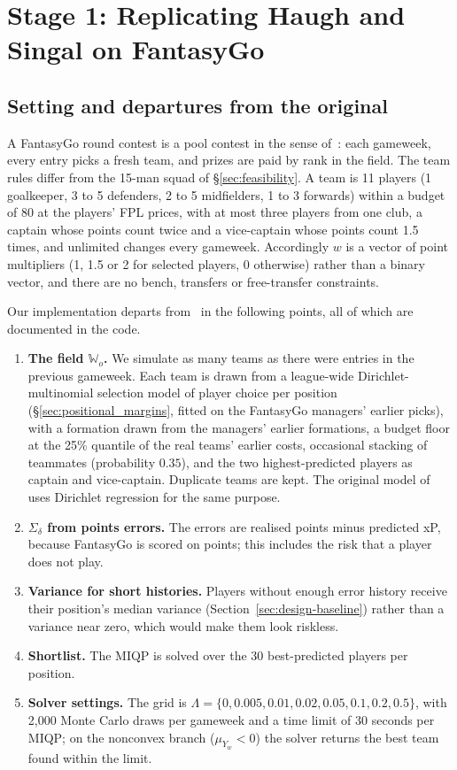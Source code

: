 \documentclass[12pt,oneside,a4paper]{book}
\theoremstyle{definition}
\theoremstyle{remark}
\begin{document}
	\section{Stage 1: Replicating Haugh and Singal on FantasyGo}
	\label{sec:s1}

	\subsection{Setting and departures from the original}
	\label{sec:s1-setting}

	A FantasyGo round contest is a pool contest in the sense of~\cite{haugh2021play}: each gameweek,
	every entry picks a fresh team, and prizes are paid by rank in the field. The team rules differ
	from the 15-man squad of \S\ref{sec:feasibility}. A team is 11 players (1 goalkeeper, 3 to 5 defenders, 2 to 5
	midfielders, 1 to 3 forwards) within a budget of 80 at the players' FPL prices, with at most
	three players from one club, a captain whose points count twice and a vice-captain whose points
	count 1.5 times, and unlimited changes every gameweek. Accordingly $w$ is a vector of point
	multipliers (1, 1.5 or 2 for selected players, 0 otherwise) rather than a binary vector, and
	there are no bench, transfers or free-transfer constraints.

	Our implementation departs from~\cite{haugh2021play} in the following points, all of which are
	documented in the code.
	\begin{enumerate}
		\item \textbf{The field $\mathbb{W}_o$.} We simulate as many teams as there were entries in the
		previous gameweek. Each team is drawn from a league-wide Dirichlet-multinomial selection
		model of player choice per position (\S\ref{sec:positional_margins}, fitted on the FantasyGo managers' earlier
		picks), with a formation drawn from the managers' earlier formations, a budget floor
		at the 25\% quantile of the real teams' earlier costs, occasional stacking of teammates
		(probability $0.35$), and the two highest-predicted players as captain and vice-captain.
		Duplicate teams are kept. The original model of~\cite{haugh2021play} uses Dirichlet
		regression for the same purpose.
		\item \textbf{$\Sigma_\delta$ from points errors.} The errors are realised points minus
		predicted xP, because FantasyGo is scored on points; this includes the risk that a player
		does not play.
		\item \textbf{Variance for short histories.} Players without enough error history receive
		their position's median variance (Section~\ref{sec:design-baseline}) rather than a
		variance near zero, which would make them look riskless.
		\item \textbf{Shortlist.} The MIQP is solved over the 30 best-predicted players per position.
		\item \textbf{Solver settings.} The grid is
		$\Lambda=\{0, 0.005, 0.01, 0.02, 0.05, 0.1, 0.2, 0.5\}$, with 2{,}000 Monte Carlo
		draws per gameweek and a time limit of 30 seconds per MIQP; on the nonconvex branch
		($\mu_{Y_w}<0$) the solver returns the best team found within the limit.
	\end{enumerate}
\end{document}
